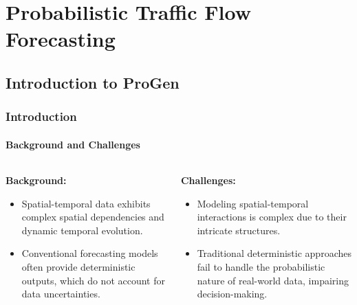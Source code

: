 \documentclass[light]{lutbeamer} %
\begin{document}
\section{Probabilistic Traffic Flow Forecasting}

\subsection{Introduction to ProGen}
\begin{frame}
    \frametitle{Introduction}
    \framesubtitle{Background and Challenges}

    \begin{columns}[T]
        \begin{column}{0.48\textwidth}
            \textbf{Background:}
            \begin{itemize}
                \item Spatial-temporal data exhibits complex spatial dependencies and dynamic temporal evolution.
                \item Conventional forecasting models often provide deterministic outputs, which do not account for data uncertainties.
            \end{itemize}
        \end{column}
        \begin{column}{0.48\textwidth}
            \textbf{Challenges:}
            \begin{itemize}
                \item Modeling spatial-temporal interactions is complex due to their intricate structures.
                \item Traditional deterministic approaches fail to handle the probabilistic nature of real-world data, impairing decision-making.
            \end{itemize}
        \end{column}
    \end{columns}
\end{frame}
\end{document}
